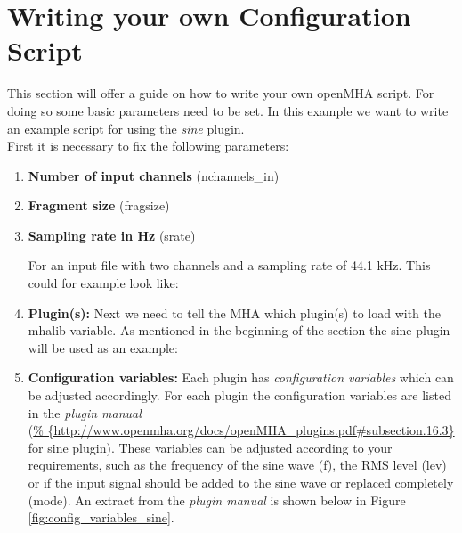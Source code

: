 \documentclass[11pt,a4paper,twoside]{article}
\newcommand{\+}{\discretionary{\mbox{\scriptsize$\hookleftarrow$}}{}{}}
\begin{document}
{{\newpage

\section{Writing your own Configuration Script}
\label{sec:own_config_script}

This section will offer a guide on how to write your own openMHA script. For doing so some basic parameters need to be set. In this example we want to write an example script for using the \textit {sine} plugin. \\



First it is necessary to fix the following parameters:

\begin{enumerate}
\item \textbf{Number of input channels} ({\ttfamily nchannels\_in})
\item \textbf{Fragment size} ({\ttfamily fragsize})
\item \textbf{Sampling rate in Hz} ({\ttfamily srate}) 

For an input file with two channels and a sampling rate of 44.1 kHz. This could for example look like: \\





\item \textbf{Plugin(s):} Next we need to tell the MHA which plugin(s) to load with the {\ttfamily mhalib} variable. As mentioned in the beginning of the section the sine plugin will be used as an example: \\



\item \textbf{Configuration variables:} Each plugin has \textit{configuration variables} which can be adjusted accordingly. For each plugin the configuration variables are listed in the \textit{plugin manual} 
\\(\footnotesize{\url{%
          {http://www.openmha.org/docs/openMHA_plugins.pdf#subsection.16.3}}}
\normalsize for sine plugin). These variables can be adjusted according to your requirements, such as the frequency of the sine wave ({\ttfamily f}), the RMS level ({\ttfamily lev}) or if the input signal should be added to the sine wave or replaced completely ({\ttfamily mode}). An extract from the \textit{plugin manual} is shown below in Figure \ref{fig:config_variables_sine}. 


\end{enumerate}}}
\end{document}
